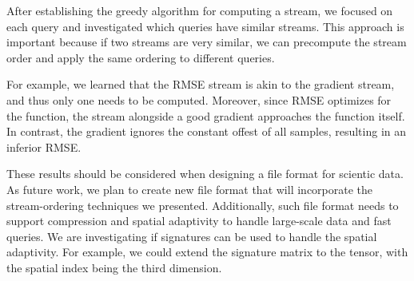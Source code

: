 After establishing the greedy algorithm for computing a stream, we focused on each query and
investigated which queries have similar streams. This approach is important because if two streams
are very similar, we can precompute the stream order and apply the same ordering to different
queries.

For example, we learned that the RMSE stream is akin to the gradient stream, and thus only one
needs to be computed. Moreover, since RMSE optimizes for the function, the stream alongside
a good gradient approaches the function itself. In contrast, the gradient ignores the constant offest
of all samples, resulting in an inferior RMSE.


These results should be considered when designing a file format for scientic data. As future work,
we plan to create new file format that will incorporate the stream-ordering techniques we presented.
Additionally, such file format needs to support compression and spatial adaptivity to handle large-scale
data and fast queries. We are investigating if signatures can be used to handle
the spatial adaptivity. For example, we could extend the signature matrix to the tensor, with
the spatial index being the third dimension.

